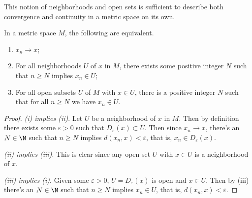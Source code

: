 This notion of neighborhoods and open sets is sufficient to describe both convergence and continuity in a metric space on its own.

\begin{proposition}
    In a metric space $M$, the following are equivalent.
    \begin{enumerate}[label=(\roman*)]
        \item $x_n \rightarrow x$;
        \item For all neighborhoods $U$ of $x$ in $M$, there exists some positive integer $N$ such that $n \geq N$ implies $x_n \in U$;
        \item For all open subsets $U$ of $M$ with $x \in U$, there is a positive integer $N$ such that for all $n \geq N$ we have $x_n \in U$.
    \end{enumerate}
\end{proposition}
\begin{proof}
    \emph{(i) implies (ii)}. Let $U$ be a neighborhood of $x$ in $M$. Then by definition there exists some $\varepsilon > 0$ such that $D_{\varepsilon}(x) \subset U$. Then since $x_n \rightarrow x$, there's an $N \in \N$ such that $n \geq N$ implies $d(x_n, x) < \varepsilon$, that is, $x_n \in D_{\varepsilon}(x)$.

    \emph{(ii) implies (iii)}. This is clear since any open set $U$ with $x \in U$ is a neighborhood of $x$.

    \emph{(iii) implies (i)}. Given some $\varepsilon > 0$, $U = D_{\varepsilon}(x)$ is open and $x \in U$. Then by (iii) there's an $N \in \N$ such that $n \geq N$ implies $x_n \in U$, that is, $d(x_n, x) < \varepsilon$.
\end{proof}


